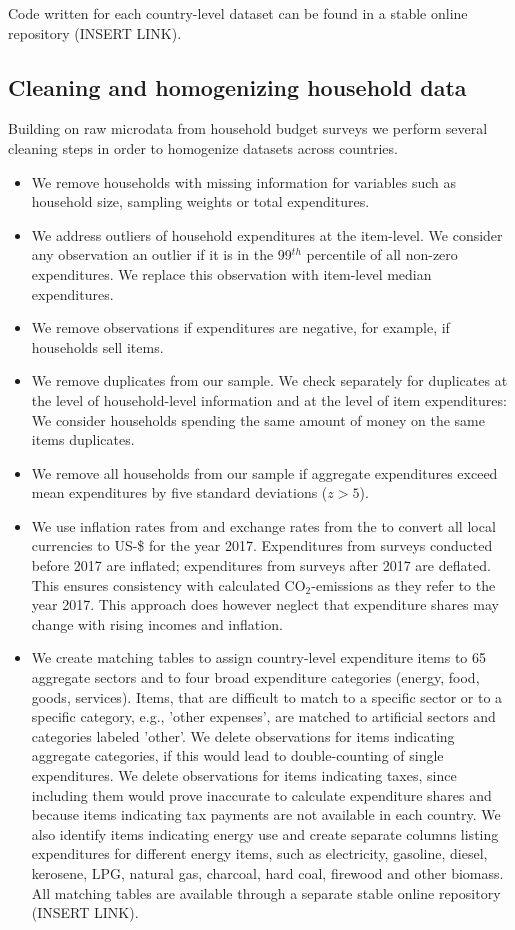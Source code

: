 \documentclass[12pt, a4paper]{article}
\begin{document}
Code written for each country-level dataset can be found in a stable online repository (INSERT LINK).

\subsection{Cleaning and homogenizing household data}

Building on raw microdata from household budget surveys we perform several cleaning steps in order to homogenize datasets across countries.

\begin{itemize}
    \item We remove households with missing information for variables such as household size, sampling weights or total expenditures.
    \item We address outliers of household expenditures at the item-level. We consider any observation an outlier if it is in the 99$^{th}$ percentile of all non-zero expenditures. We replace this observation with item-level median expenditures.
    \item We remove observations if expenditures are negative, for example, if households sell items.
    \item We remove duplicates from our sample. We check separately for duplicates at the level of household-level information and at the level of item expenditures: We consider households spending the same amount of money on the same items duplicates.
    \item We remove all households from our sample if aggregate expenditures exceed mean expenditures by five standard deviations ($z>5$).
    \item We use inflation rates from \textcite{IMF.2020} and exchange rates from the \textcite{WorldBankGroup.2023} to convert all local currencies to US-\$ for the year 2017. Expenditures from surveys conducted before 2017 are inflated; expenditures from surveys after 2017 are deflated. This ensures consistency with calculated CO$_{2}$-emissions as they refer to the year 2017. This approach does however neglect that expenditure shares may change with rising incomes and inflation.
    \item We create matching tables to assign country-level expenditure items to 65 aggregate sectors and to four broad expenditure categories (energy, food, goods, services). Items, that are difficult to match to a specific sector or to a specific category, e.g., 'other expenses', are matched to artificial sectors and categories labeled 'other'. We delete observations for items indicating aggregate categories, if this would lead to double-counting of single expenditures. We delete observations for items indicating taxes, since including them would prove inaccurate to calculate expenditure shares and because items indicating tax payments are not available in each country. We also identify items indicating energy use and create separate columns listing expenditures for different energy items, such as electricity, gasoline, diesel, kerosene, LPG, natural gas, charcoal, hard coal, firewood and other biomass. All matching tables are available through a separate stable online repository (INSERT LINK).

\end{itemize}
\end{document}
